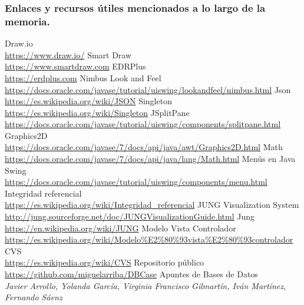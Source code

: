 \begin{thebibliography}{9}
\subsubsection*{Enlaces y recursos útiles mencionados a lo largo de la memoria.}

Draw.io\\
\url{https://www.draw.io/}
Smart Draw\\
\url{https://www.smartdraw.com}
EDRPlus\\
\url{https://erdplus.com}
Nimbus Look and Feel
\\\url{https://docs.oracle.com/javase/tutorial/uiswing/lookandfeel/nimbus.html}
Json
\\\url{https://es.wikipedia.org/wiki/JSON}
Singleton
\\\url{https://es.wikipedia.org/wiki/Singleton}
JSplitPane
\\\url{https://docs.oracle.com/javase/tutorial/uiswing/components/splitpane.html}
Graphics2D
\\\url{https://docs.oracle.com/javase/7/docs/api/java/awt/Graphics2D.html}
Math
\\\url{https://docs.oracle.com/javase/7/docs/api/java/lang/Math.html}
Menús en Java Swing
\\\url{https://docs.oracle.com/javase/tutorial/uiswing/components/menu.html}
Integridad referencial
\\\url{https://es.wikipedia.org/wiki/Integridad_referencial}
JUNG Visualization System
\\\url{http://jung.sourceforge.net/doc/JUNGVisualizationGuide.html}
Jung
\\\url{https://en.wikipedia.org/wiki/JUNG}
Modelo Vista Controlador
\\\url{https://es.wikipedia.org/wiki/Modelo\%E2\%80\%93vista\%E2\%80\%93controlador}
CVS
\\\url{https://es.wikipedia.org/wiki/CVS}
Repositorio público
\\\url{https://github.com/miguelarriba/DBCase}
\bibitem{} 
Apuntes de Bases de Datos\\
\textit{Javier Arrollo, Yolanda García, Virginia Francisco Gilmartín, Iván Martínez, Fernando Sáenz}
\end{thebibliography}